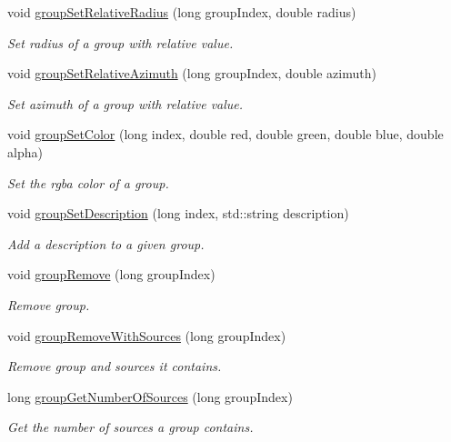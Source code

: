 \begin{DoxyCompactItemize}
void \hyperlink{class_hoa2_d_1_1_sources_manager_a1b7db728b190271aa5ec12ed589a27d0}{group\-Set\-Relative\-Radius} (long group\-Index, double radius)
\begin{DoxyCompactList}\small\item\em Set radius of a group with relative value. \end{DoxyCompactList}\item 
void \hyperlink{class_hoa2_d_1_1_sources_manager_ab16a0878aab7105c7e8c03b8d0685b78}{group\-Set\-Relative\-Azimuth} (long group\-Index, double azimuth)
\begin{DoxyCompactList}\small\item\em Set azimuth of a group with relative value. \end{DoxyCompactList}\item 
void \hyperlink{class_hoa2_d_1_1_sources_manager_a545ddb69dd5e532411d4a8415f8370b2}{group\-Set\-Color} (long index, double red, double green, double blue, double alpha)
\begin{DoxyCompactList}\small\item\em Set the rgba color of a group. \end{DoxyCompactList}\item 
void \hyperlink{class_hoa2_d_1_1_sources_manager_a6a8d15a9903b018e3282ff09902f2948}{group\-Set\-Description} (long index, std\-::string description)
\begin{DoxyCompactList}\small\item\em Add a description to a given group. \end{DoxyCompactList}\item 
void \hyperlink{class_hoa2_d_1_1_sources_manager_a37e24a513e671f284dc8d90cb5d2e426}{group\-Remove} (long group\-Index)
\begin{DoxyCompactList}\small\item\em Remove group. \end{DoxyCompactList}\item 
void \hyperlink{class_hoa2_d_1_1_sources_manager_aa84f8256f9e764e6004eaa392237ed43}{group\-Remove\-With\-Sources} (long group\-Index)
\begin{DoxyCompactList}\small\item\em Remove group and sources it contains. \end{DoxyCompactList}\item 
long \hyperlink{class_hoa2_d_1_1_sources_manager_a969be8b5b10c7d6ce9b125e855f8edcc}{group\-Get\-Number\-Of\-Sources} (long group\-Index)
\begin{DoxyCompactList}\small\item\em Get the number of sources a group contains. \end{DoxyCompactList}\item 

\end{DoxyCompactItemize}
